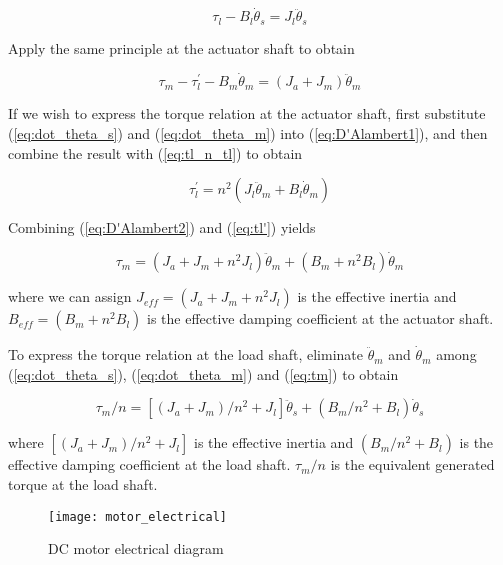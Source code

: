 \begin{equation} \label{eq:D'Alambert1}
	\tau_l - B_l \dot{\theta}_s = J_l \ddot{\theta}_s
\end{equation}

\noindent Apply the same principle at the actuator shaft to obtain

\begin{equation} \label{eq:D'Alambert2}
	\tau_m - \tau_l^{'} - B_m \dot{\theta}_m = \left(J_a + J_m \right)\ddot{\theta}_m
\end{equation}

\noindent If we wish to express the torque relation at the actuator shaft, first substitute (\ref{eq:dot_theta_s}) and (\ref{eq:dot_theta_m}) into (\ref{eq:D'Alambert1}), and then combine the result with (\ref{eq:tl_n_tl}) to obtain

\begin{equation} \label{eq:tl'}
	\tau_l^{'} = n^2 \left(J_l \ddot{\theta}_m + B_l \dot{\theta}_m \right)
\end{equation}

\noindent Combining (\ref{eq:D'Alambert2}) and (\ref{eq:tl'}) yields

\begin{equation} \label{eq:tm}
	\tau_m = \left( J_a + J_m + n^2 J_l \right) \ddot{\theta}_m + \left(B_m + n^2 B_l \right) \dot{\theta}_m 
\end{equation}

\noindent where we can assign $ J_{eff} = \left(J_a + J_m + n^2 J_l \right)$ is the effective inertia and $ B_{eff} = \left( B_m + n^2 B_l \right)$ is the effective damping coefficient at the actuator shaft.

To express the torque relation at the load shaft, eliminate $\ddot{\theta}_m$ and $\dot{\theta}_m$ among (\ref{eq:dot_theta_s}), (\ref{eq:dot_theta_m}) and (\ref{eq:tm}) to obtain

\begin{equation} \label{tm/n}
	\tau_m / n = \left[\left(J_a + J_m \right)/n^2 + J_l \right] \ddot{\theta}_s + \left(B_m/n^2 + B_l \right)\dot{\theta}_s
\end{equation}

\noindent where $ \left[\left(J_a + J_m \right)/n^2 + J_l \right] $ is the effective inertia and $\left(B_m/n^2 + B_l \right)$ is the effective damping coefficient at the load shaft. $\tau_m / n $ is the equivalent generated torque at the load shaft. 

\begin{figure}[b]
	\begin{center}
		\texttt{[image: motor\_electrical]}
		\caption{DC motor electrical diagram}
		\label{Fig:Electrical Diagram}
	\end{center}
\end{figure}

